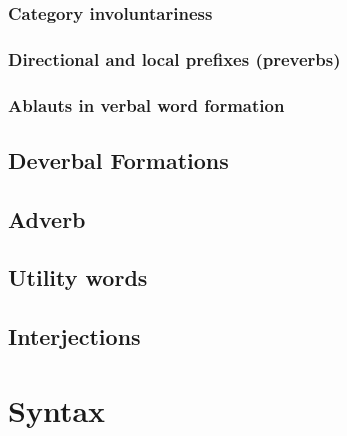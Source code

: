 \documentclass[a4paper,12pt]{book}
\newcommand{\1}[1]{\textbf{\emph{#1}}} %
\newcommand{\2}[1]{\textbf{[#1]}} %
\newcommand{\3}[1]{\fontsize{11pt}{0cm}\textbf{\emph{#1}}} %
\newcommand{\4}[1]{\fontsize{10pt}{0cm}\emph{#1}}	%
\newcommand{\5}[1]{\textbf{/#1/}} %
\newcommand{\6}[1]{\textbf{[#1]}} %
\newcommand{\7}[1]{\fontsize{12pt}{0cm}\emph{#1}} %
\newcommand{\8}[1]{\fontsize{12pt}{0cm}`#1'} %
\newcommand{\9}[1]{\fontsize{12pt}{0cm}(lit. `#1')} %
\begin{document}
\subsection{Category involuntariness}
\subsection{Directional and local prefixes (preverbs)}
\subsection{Ablauts in verbal word formation}

\section{Deverbal Formations}
\section{Adverb}
\section{Utility words}
\section{Interjections}
\chapter{Syntax}
\end{document}

